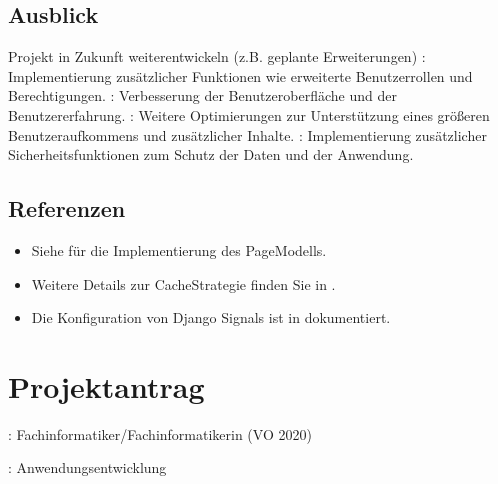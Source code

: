 \documentclass[a4paper,12pt,ngerman]{sphinxmanual}
\begin{document}
\subsection{Ausblick}
\label{\detokenize{sections/fazit:ausblick}}
\sphinxAtStartPar
Projekt in Zukunft weiterentwickeln (z.B. geplante Erweiterungen)
\sphinxhyphen{} : Implementierung zusätzlicher Funktionen wie erweiterte Benutzerrollen und Berechtigungen.
\sphinxhyphen{} : Verbesserung der Benutzeroberfläche und der Benutzererfahrung.
\sphinxhyphen{} : Weitere Optimierungen zur Unterstützung eines größeren Benutzeraufkommens und zusätzlicher Inhalte.
\sphinxhyphen{} : Implementierung zusätzlicher Sicherheitsfunktionen zum Schutz der Daten und der Anwendung.


\subsection{Referenzen}
\label{\detokenize{sections/fazit:referenzen}}\begin{itemize}
\item {} 
\sphinxAtStartPar
Siehe {\hyperref[\detokenize{sections/models:module-pages_app.models.Page}]{}} für die Implementierung des Page\sphinxhyphen{}Modells.

\item {} 
\sphinxAtStartPar
Weitere Details zur Cache\sphinxhyphen{}Strategie finden Sie in .

\item {} 
\sphinxAtStartPar
Die Konfiguration von Django Signals ist in  dokumentiert.

\end{itemize}

\sphinxstepscope


\section{Projektantrag}
\label{\detokenize{sections/antrag:projektantrag}}\label{\detokenize{sections/antrag::doc}}
\sphinxAtStartPar
{}: Fachinformatiker/Fachinformatikerin (VO 2020)

\sphinxAtStartPar
{}: Anwendungsentwicklung
\end{document}
